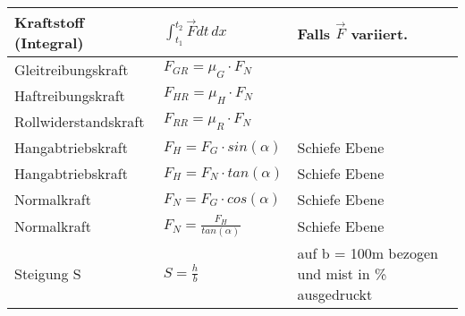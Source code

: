 \begin{tabularx}{\columnwidth}{@{}XXX@{}}
	Kraftstoff (Integral)                     & $ \int_{t_1}^{t_2} \vec{F}dt \,dx $                              & Falls $\vec{F}$ variiert.                                                                                                          \\ \hline
	Gleitreibungskraft                        & $ F_{GR} = \mu_G\cdot F_N $                                                                                                                                                                           \\ \hline
	Haftreibungskraft                         & $ F_{HR} = \mu_H\cdot F_N $                                                                                                                                                                           \\ \hline
	Rollwiderstandskraft                      & $ F_{RR} = \mu_R\cdot F_N $                                                                                                                                                                           \\ \hline
	Hangabtriebskraft                         & $ F_H = F_G \cdot sin(\alpha) $                                  & Schiefe Ebene                                                                                                                      \\ \hline
	Hangabtriebskraft                         & $ F_H = F_N \cdot tan(\alpha) $                                  & Schiefe Ebene                                                                                                                      \\ \hline
	Normalkraft                               & $ F_N = F_G \cdot cos(\alpha) $                                  & Schiefe Ebene                                                                                                                      \\ \hline
	Normalkraft                               & $ F_N = \frac{F_H}{tan(\alpha)} $                                & Schiefe Ebene                                                                                                                      \\ \hline
	Steigung S                                & $S = \frac{h}{b}$                                                & auf b = 100m bezogen und mist in \% ausgedruckt                                                                                    \\ \hline

\end{tabularx}
